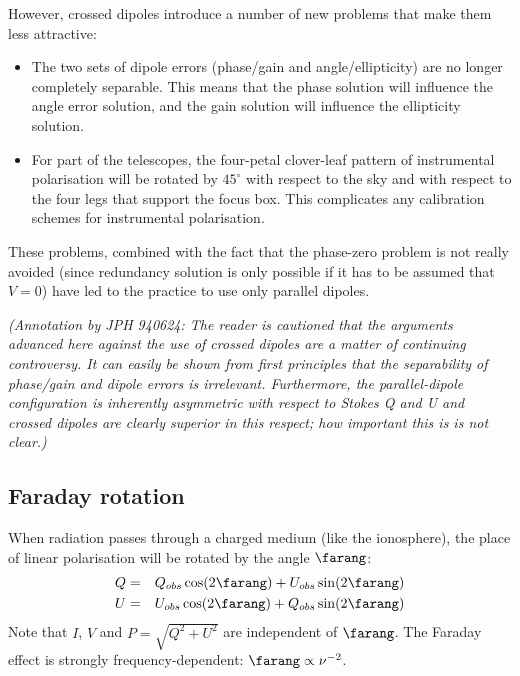 	However, crossed dipoles introduce a number of new problems that make
them less attractive:
%
\begin{itemize}

\item The two sets of dipole errors (phase/gain and angle/ellipticity) are no
longer completely separable.  This means that the phase solution will influence
the angle error solution, and the gain solution will influence the ellipticity
solution.

\item For part of the telescopes, the four-petal clover-leaf pattern of
instrumental polarisation will be rotated by $45^\circ$ with respect to the sky
and with respect to the four legs that support the focus box. This complicates
any calibration schemes for instrumental polarisation.

\end{itemize}

	These problems, combined with the fact that the phase-zero problem is
not really avoided (since redundancy solution is only possible if it has to be
assumed that $V=0$) have led to the practice to use only parallel dipoles.

	{\it (Annotation by JPH 940624: The reader is cautioned that the
arguments advanced here against the use of crossed dipoles are a matter of
continuing controversy.  It can easily be shown from first principles that the
separability of phase/gain and dipole errors is irrelevant. Furthermore, the
parallel-dipole configuration is inherently asymmetric with respect to Stokes
{\em Q} and {\em U} and crossed dipoles are clearly superior in this respect;
how important this is is not clear.)}


\subsection{Faraday rotation}

When radiation passes through a charged medium (like the ionosphere), the place
of linear polarisation will be rotated by the angle $\farang$:
%
\begin{eqnarray} Q &=& Q_{obs}\cos(2\farang) + U_{obs}\sin(2\farang) \nonumber
\\ U &=& U_{obs}\cos(2\farang) + Q_{obs}\sin(2\farang)
\label{.equ.pol.024}
\end{eqnarray}
%
Note that $I$, $V$ and $P=\sqrt{Q^2+U^2}$ are independent of $\farang$. The
Faraday effect is strongly frequency-dependent: $\farang \propto \nu^{-2}$.


